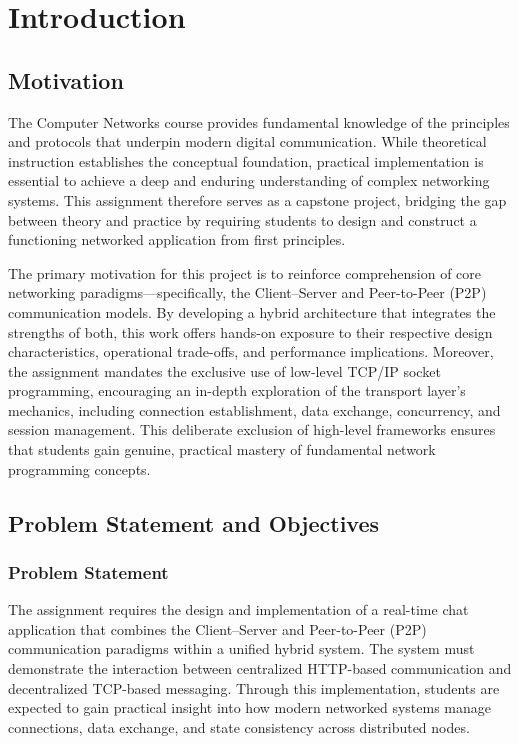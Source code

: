 \section{Introduction}

\subsection{Motivation}

The Computer Networks course provides fundamental knowledge of the principles and protocols that underpin modern digital communication. While theoretical instruction establishes the conceptual foundation, practical implementation is essential to achieve a deep and enduring understanding of complex networking systems. This assignment therefore serves as a capstone project, bridging the gap between theory and practice by requiring students to design and construct a functioning networked application from first principles.

The primary motivation for this project is to reinforce comprehension of core networking paradigms—specifically, the Client–Server and Peer-to-Peer (P2P) communication models. By developing a hybrid architecture that integrates the strengths of both, this work offers hands-on exposure to their respective design characteristics, operational trade-offs, and performance implications. Moreover, the assignment mandates the exclusive use of low-level TCP/IP socket programming, encouraging an in-depth exploration of the transport layer’s mechanics, including connection establishment, data exchange, concurrency, and session management. This deliberate exclusion of high-level frameworks ensures that students gain genuine, practical mastery of fundamental network programming concepts.

\subsection{Problem Statement and Objectives}

\subsubsection{Problem Statement}
The assignment requires the design and implementation of a real-time chat application that combines the Client–Server and Peer-to-Peer (P2P) communication paradigms within a unified hybrid system. The system must demonstrate the interaction between centralized HTTP-based communication and decentralized TCP-based messaging. Through this implementation, students are expected to gain practical insight into how modern networked systems manage connections, data exchange, and state consistency across distributed nodes.

